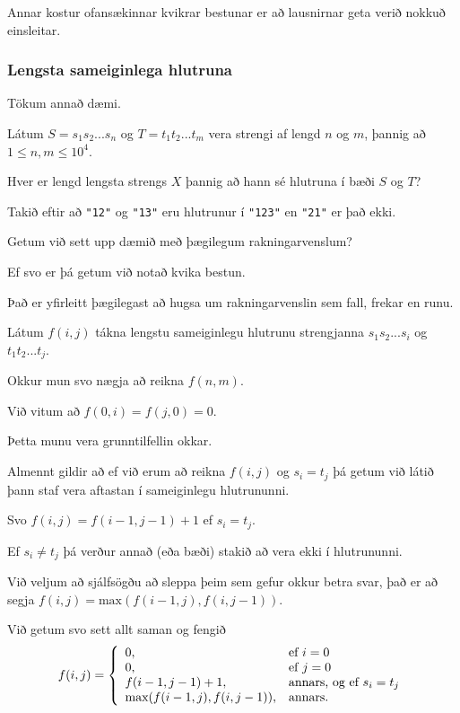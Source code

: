 {
	{
		\item<1-> Annar kostur ofansækinnar kvikrar bestunar er að lausnirnar geta verið nokkuð einsleitar.
		\item<2->[]
	}
}

{
	\frametitle{Lengsta sameiginlega hlutruna}
	{
		\item<1-> Tökum annað dæmi.
		\item<2-> Látum $S = s_1s_2...s_n$ og $T = t_1t_2...t_m$ vera strengi af lengd $n$ og $m$, þannig að $1 \leq n, m \leq 10^4$.
		\item<3-> Hver er lengd lengsta strengs $X$ þannig að hann sé hlutruna í bæði $S$ og $T$?
		\item<4-> Takið eftir að \texttt{"12"} og \texttt{"13"} eru hlutrunur í \texttt{"123"} en \texttt{"21"} er það ekki.
	}
}

{
	{
		\item<1-> Getum við sett upp dæmið með þægilegum rakningarvenslum?
		\item<2-> Ef svo er þá getum við notað kvika bestun.
		\item<3-> Það er yfirleitt þægilegast að hugsa um rakningarvenslin sem fall, frekar en runu.
		\item<4-> Látum $f(i, j)$ tákna lengstu sameiginlegu hlutrunu strengjanna $s_1s_2...s_i$ og $t_1t_2...t_j$.
		\item<5-> Okkur mun svo nægja að reikna $f(n, m)$.
	}
}

{
	{
		\item<1-> Við vitum að $f(0, i) = f(j, 0) = 0$.
		\item<2-> Þetta munu vera grunntilfellin okkar.
		\item<3-> Almennt gildir að ef við erum að reikna $f(i, j)$ og $s_i = t_j$ þá getum við látið þann staf vera aftastan í sameiginlegu hlutrununni.
		\item<4-> Svo $f(i, j) = f(i - 1, j - 1) + 1$ ef $s_i = t_j$.
		\item<5-> Ef $s_i \neq t_j$ þá verður annað (eða bæði) stakið að vera ekki í hlutrununni.
		\item<6-> Við veljum að sjálfsögðu að sleppa þeim sem gefur okkur betra svar, það er að segja $f(i, j) = \text{max}(f(i - 1, j), f(i, j - 1))$.
		\item<7-> Við getum svo sett allt saman og fengið
		\[
			f(i, j) =
			\left \{
			\env{array}
			{
				{l l}
				0, & \text{ef $i = 0$}\\
				0, & \text{ef $j = 0$}\\
				f(i - 1, j - 1) + 1, & \text{annars, og ef $s_i = t_j$}\\
				\text{max}(f(i - 1, j), f(i, j - 1)), & \text{annars}.
			}
			\right .
		\]
	}
}

